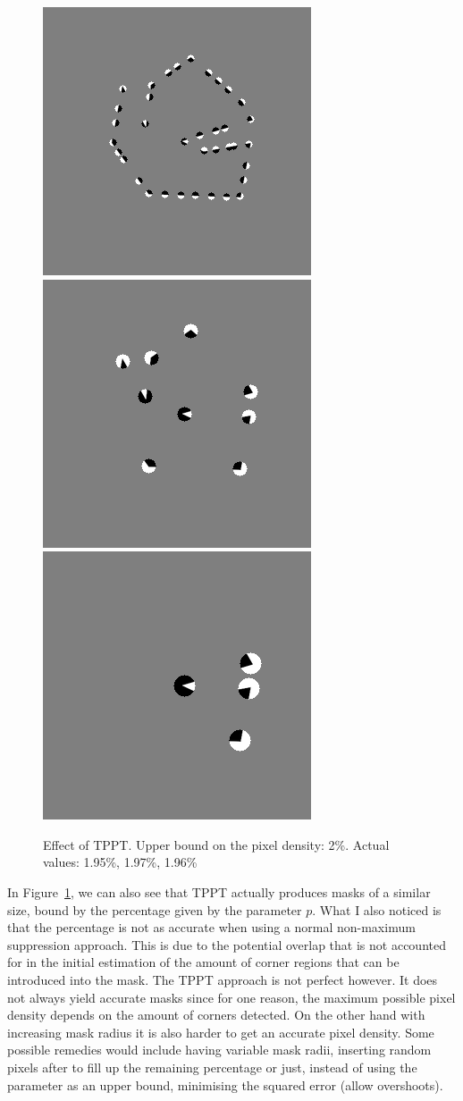 \begin{figure}[ht]
    \centering
    \includegraphics[width=0.3\linewidth]{../Images/tppt_ex/abstract1_small4.png}
    \includegraphics[width=0.3\linewidth]{../Images/tppt_ex/abstract1_small8.png}
    \includegraphics[width=0.3\linewidth]{../Images/tppt_ex/abstract1_small12.png}
    \caption{Effect of TPPT\@. Upper bound on the pixel density: 2\%. Actual values:
    1.95\%, 1.97\%, 1.96\%}\label{fig:TPPTEx}
\end{figure}
In Figure~\ref{fig:TPPTEx}, we can also see that TPPT actually produces masks of a
similar size, bound by the percentage given by the parameter $p$. What I also noticed is that the
percentage is not as accurate when using a normal non-maximum suppression approach. This is due to
the potential overlap that is not accounted for in the initial estimation of the amount of corner
regions that can be introduced into the mask.
The TPPT approach is not perfect however. It does not always yield accurate masks since for one
reason, the maximum possible pixel density depends on the amount of corners detected. On the other
hand with increasing mask radius it is also harder to get an accurate pixel density. Some possible
remedies would include having variable mask radii, inserting random pixels after to fill up the
remaining percentage or just, instead of using the parameter as an upper bound, minimising the
squared error (allow overshoots).

